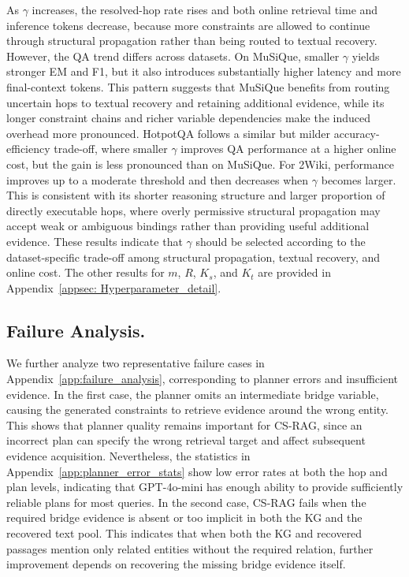 \documentclass{article}
\theoremstyle{plain}
\theoremstyle{definition}
\theoremstyle{remark}
\begin{document}
As $\gamma$ increases, the resolved-hop rate rises and both online retrieval time and inference tokens decrease, because more constraints are allowed to continue through structural propagation rather than being routed to textual recovery. However, the QA trend differs across datasets. 
On MuSiQue, smaller $\gamma$ yields stronger EM and F1, but it also introduces substantially higher latency and more final-context tokens. This pattern suggests that MuSiQue benefits from routing uncertain hops to textual recovery and retaining additional evidence, while its longer constraint chains and richer variable dependencies make the induced overhead more pronounced. HotpotQA follows a similar but milder accuracy-efficiency trade-off, where smaller \(\gamma\) improves QA performance at a higher online cost, but the gain is less pronounced than on MuSiQue. For 2Wiki, performance improves up to a moderate threshold and then decreases when $\gamma$ becomes larger. 
This is consistent with its shorter reasoning structure and larger proportion of directly executable hops, where overly permissive structural propagation may accept weak or ambiguous bindings rather than providing useful additional evidence. 
These results indicate that $\gamma$ should be selected according to the dataset-specific trade-off among structural propagation, textual recovery, and online cost. 
The other results for $m$, $R$, $K_s$, and $K_t$ are provided in Appendix~\ref{appsec: Hyperparameter_detail}.



\subsection{Failure Analysis.}

We further analyze two representative failure cases in Appendix~\ref{app:failure_analysis}, corresponding to planner errors and insufficient evidence. 
In the first case, the planner omits an intermediate bridge variable, causing the generated constraints to retrieve evidence around the wrong entity. 
This shows that planner quality remains important for CS-RAG, since an incorrect plan can specify the wrong retrieval target and affect subsequent evidence acquisition. 
Nevertheless, the statistics in Appendix~\ref{app:planner_error_stats} show low error rates at both the hop and plan levels, indicating that GPT-4o-mini has enough ability to provide sufficiently reliable plans for most queries. 
In the second case, CS-RAG fails when the required bridge evidence is absent or too implicit in both the KG and the recovered text pool. 
This indicates that when both the KG and recovered passages mention only related entities without the required relation, further improvement depends on recovering the missing bridge evidence itself.
\end{document}
